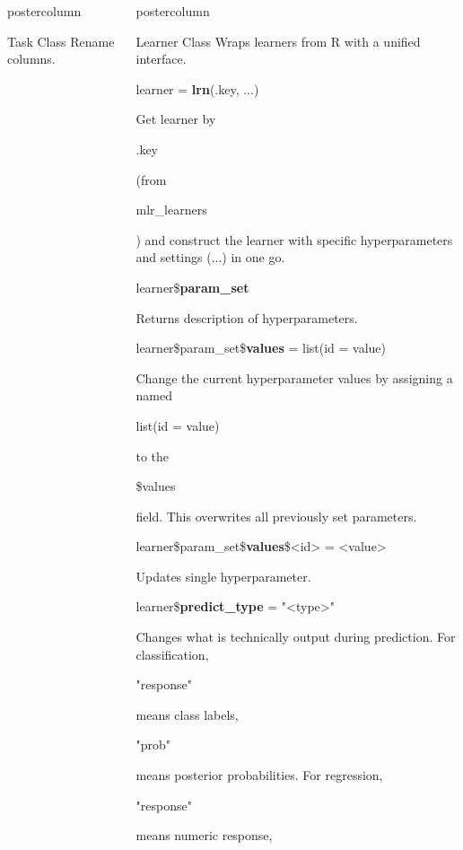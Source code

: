 \documentclass{beamer}
\newlength{\columnheight} %
\newcommand{\codeinline}[1]{\begin{codeboxinline}#1\end{codeboxinline}}
\begin{document}
\begin{frame}[fragile]{}
\begin{columns}
\begin{column}{.245\textwidth}
\begin{beamercolorbox}[center]{postercolumn}
\begin{minipage}{.98\textwidth}
{\begin{myblock}{Task Class}
							Rename columns.
						\end{myblock}
					\vfill}
				\end{minipage}
			\end{beamercolorbox}
		\end{column}
		\begin{column}{.245\textwidth}
			\begin{beamercolorbox}[center]{postercolumn}
				\begin{minipage}{.98\textwidth}
					\parbox[t][\columnheight]{\textwidth}{
						\begin{myblock}{Learner Class}
							Wraps learners from R with a unified interface.
							\\
							\begin{codebox}
								learner = \textbf{lrn}(.key, ...)
							\end{codebox}
							Get learner by \codeinline{.key} (from \codeinline{mlr\_learners}) 
							and construct the learner with specific hyperparameters and settings (...) in one go.
							\\
							\begin{codebox}
								learner\$\textbf{param\_set}
							\end{codebox}
							Returns description of hyperparameters.	
							\\
							\begin{codebox}
								learner\$param\_set\$\textbf{values} = list(id = value)
							\end{codebox}
							Change the current hyperparameter values by assigning a named \codeinline{list(id = value)} to the \codeinline{\$values} field.
							This overwrites all previously set parameters.	
							\\
							\begin{codebox}
								learner\$param\_set\$\textbf{values}\$<id> = <value>
							\end{codebox}
							Updates single hyperparameter.
							\vspace{1em}
							\\
							\begin{codebox}
								learner\$\textbf{predict\_type} = "<type>"
							\end{codebox}
							Changes what is technically output during prediction. For classification, 
	                        \codeinline{"response"} means class labels, \codeinline{"prob"} means posterior probabilities.
	                        For regression, \codeinline{"response"} means numeric response, 

\end{myblock}}
\end{minipage}
\end{beamercolorbox}
\end{column}
\end{columns}
\end{frame}
\end{document}
